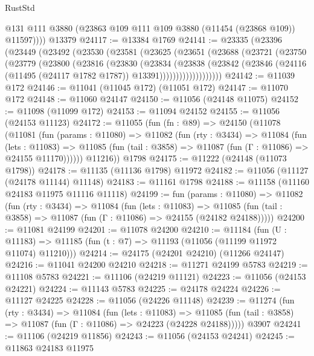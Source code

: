 \begin{lexlean}{RustStd}
\begin{coremodule}
          @131
          @111
          @3880
          (@23863 @109 @111 @109 @3880 (@11454 (@23868 @109)) @11597))))
    @13379
@24117 := @13384 @1769
@24141 := @23335
    (@23396
      (@23449
        (@23492
          (@23530
            (@23581
              (@23625
                (@23651
                  (@23688
                    (@23721
                      (@23750
                        (@23779
                          (@23800
                            (@23816
                              (@23830
                                (@23834
                                  (@23838
                                    (@23842
                                      (@23846
                                        (@24116
                                          (@11495 (@24117 @1782 @1787))
                                          @13391)))))))))))))))))))
@24142 := @11039 @172
@24146 := @11041 (@11045 @172) (@11051 @172)
@24147 := @11070 @172
@24148 := @11060 @24147
@24150 := @11056 (@24148 @11075)
@24152 := @11098 (@11099 @172)
@24153 := @11094 @24152
@24155 := @11056 (@24153 @11123)
@24172 := @11055
    (fun (fn : @89) =>
    @24150
      (@11078
        (@11081
          (fun (params : @11080) =>
          @11082
            (fun (rty : @3434) =>
            @11084
              (fun (lets : @11083) =>
              @11085 (fun (tail : @3858) => @11087 (fun (Γ : @11086) => @24155 @11170))))))
        @11216))
    @1798
@24175 := @11222 (@24148 (@11073 @1798))
@24178 := @11135 (@11136 @1798) @11972
@24182 := @11056 (@11127 (@24178 @11144) @11148)
@24183 := @11161 @1798
@24188 := @11158 (@11160 @24183 @11975 @11116 @11118)
@24199 := fun (params : @11080) =>
  @11082
    (fun (rty : @3434) =>
    @11084
      (fun (lets : @11083) =>
      @11085 (fun (tail : @3858) => @11087 (fun (Γ : @11086) => @24155 (@24182 @24188)))))
@24200 := @11081 @24199
@24201 := @11078 @24200
@24210 := @11184
    (fun (U : @11183) => @11185 (fun (t : @7) => @11193 (@11056 (@11199 @11972 @11074) @11210)))
@24214 := @24175 (@24201 @24210) (@11266 @24147)
@24216 := @11041 @24200 @24210
@24218 := @11271 @24199 @5783
@24219 := @11108 @5783
@24221 := @11106 (@24219 @11121)
@24223 := @11056 (@24153 @24221)
@24224 := @11143 @5783
@24225 := @24178 @24224
@24226 := @11127 @24225
@24228 := @11056 (@24226 @11148)
@24239 := @11274
    (fun (rty : @3434) =>
    @11084
      (fun (lets : @11083) =>
      @11085 (fun (tail : @3858) => @11087 (fun (Γ : @11086) => @24223 (@24228 @24188)))))
    @3907
@24241 := @11106 (@24219 @11856)
@24243 := @11056 (@24153 @24241)
@24245 := @11863 @24183 @11975

\end{coremodule}
\end{lexlean}
